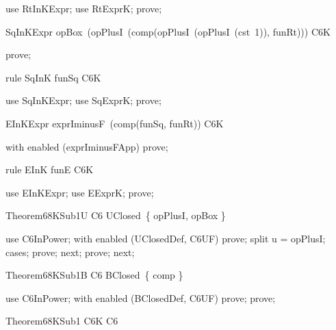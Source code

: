 \documentclass{article}
\begin{document}
\begin{zproof}
use RtInKExpr;
use RtExprK;
prove;
\end{zproof}
\begin{theorem}{SqInKExpr}
  opBox~(opPlusI~(comp(opPlusI~(opPlusI~(cst~1)), funRt))) \in C6K
\end{theorem}

\begin{zproof}
prove;
\end{zproof}

\begin{theorem}{rule SqInK}
  funSq \in C6K
\end{theorem}

\begin{zproof}
use SqInKExpr;
use SqExprK;
prove;
\end{zproof}
\begin{theorem}{EInKExpr}
  exprIminusF~(comp(funSq, funRt)) \in C6K
\end{theorem}

\begin{zproof}
with enabled (exprIminusFApp) prove;
\end{zproof}

\begin{theorem}{rule EInK}
  funE \in C6K
\end{theorem}

\begin{zproof}
use EInKExpr;
use EExprK;
prove;
\end{zproof}

\begin{theorem}{Theorem68KSub1U}
  C6 \in UClosed~\{ opPlusI, opBox \}
\end{theorem}

\begin{zproof}
use C6InPower;
with enabled (UClosedDef, C6UF) prove;
split u = opPlusI;
cases;
prove;
next;
prove;
next;
\end{zproof}

\begin{theorem}{Theorem68KSub1B}
  C6 \in BClosed~\{ comp \}
\end{theorem}

\begin{zproof}
use C6InPower;
with enabled (BClosedDef, C6UF) prove;
prove;
\end{zproof}

\begin{theorem}{Theorem68KSub1}
  C6K \subseteq C6
\end{theorem}
\end{document}
